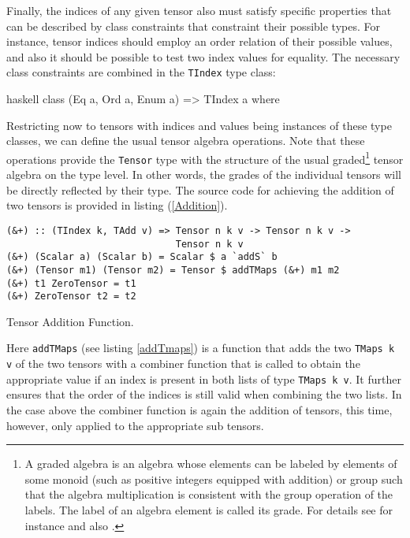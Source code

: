 Finally, the indices of any given tensor also must satisfy specific properties that can be described by class constraints that constraint their possible types. For instance, tensor indices should employ an order relation of their possible values, and also it should be possible to test two index values for equality. The necessary class constraints are combined in the \texttt{TIndex} type class:
\begin{center}
\begin{cminted}{haskell}
class (Eq a, Ord a, Enum a) => TIndex a where
\end{cminted} 
\end{center}



Restricting now to tensors with indices and values being instances of these type classes, we can define the usual tensor algebra operations.
Note that these operations provide the \texttt{Tensor} type with the structure of the usual graded\footnote{A graded algebra is an algebra whose elements can be labeled by elements of some monoid (such as positive integers equipped with addition) or group such that the algebra multiplication is consistent with the group operation of the labels. The label of an algebra element is called its grade.
For details see for instance \cite{bourbaki1998algebra} and also \cite{nlab:gradedAlg}.} tensor algebra on the type level. In other words, the grades of the individual tensors will be directly reflected by their type.
The source code for achieving the addition of two tensors is provided in listing (\ref{Addition}).
\begin{listing}[hbt!]
\begin{verbatim}
(&+) :: (TIndex k, TAdd v) => Tensor n k v -> Tensor n k v ->
                              Tensor n k v
(&+) (Scalar a) (Scalar b) = Scalar $ a `addS` b
(&+) (Tensor m1) (Tensor m2) = Tensor $ addTMaps (&+) m1 m2
(&+) t1 ZeroTensor = t1
(&+) ZeroTensor t2 = t2
\end{verbatim} 
\caption{Tensor Addition Function.}\label{Addition}
\end{listing}
Here \texttt{addTMaps} (see listing \ref{addTmaps}) is a function that adds the two \texttt{TMaps k v} of the two tensors with a combiner function that is called to obtain the appropriate value if an index is present in both lists of type \texttt{TMaps k v}. It further ensures that the order of the indices is still valid when combining the two lists. In the case above the combiner function is again the addition of tensors, this time, however, only applied to the appropriate sub tensors. 

